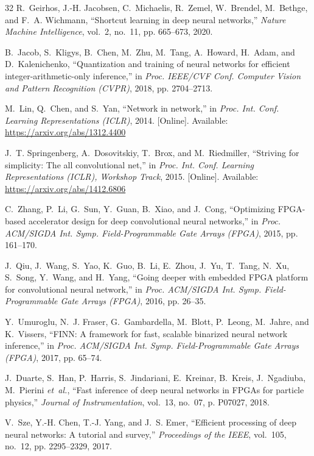 \documentclass[conference]{IEEEtran}
\begin{document}
\begin{thebibliography}{32}
R.~Geirhos, J.-H. Jacobsen, C.~Michaelis, R.~Zemel, W.~Brendel, M.~Bethge, and F.~A. Wichmann,
``Shortcut learning in deep neural networks,'' \emph{Nature Machine Intelligence}, vol.~2,
no.~11, pp. 665--673, 2020.

B.~Jacob, S.~Kligys, B.~Chen, M.~Zhu, M.~Tang, A.~Howard, H.~Adam, and D.~Kalenichenko,
``Quantization and training of neural networks for efficient integer-arithmetic-only
inference,'' in \emph{Proc. IEEE/CVF Conf. Computer Vision and Pattern Recognition (CVPR)},
2018, pp. 2704--2713.

M.~Lin, Q.~Chen, and S.~Yan, ``Network in network,'' in \emph{Proc. Int. Conf. Learning
Representations (ICLR)}, 2014. [Online]. Available: \url{https://arxiv.org/abs/1312.4400}

J.~T. Springenberg, A.~Dosovitskiy, T.~Brox, and M.~Riedmiller, ``Striving for simplicity: The
all convolutional net,'' in \emph{Proc. Int. Conf. Learning Representations (ICLR), Workshop
Track}, 2015. [Online]. Available: \url{https://arxiv.org/abs/1412.6806}

C.~Zhang, P.~Li, G.~Sun, Y.~Guan, B.~Xiao, and J.~Cong, ``Optimizing {FPGA}-based accelerator
design for deep convolutional neural networks,'' in \emph{Proc. ACM/SIGDA Int. Symp.
Field-Programmable Gate Arrays (FPGA)}, 2015, pp. 161--170.

J.~Qiu, J.~Wang, S.~Yao, K.~Guo, B.~Li, E.~Zhou, J.~Yu, T.~Tang, N.~Xu, S.~Song, Y.~Wang, and
H.~Yang, ``Going deeper with embedded {FPGA} platform for convolutional neural network,'' in
\emph{Proc. ACM/SIGDA Int. Symp. Field-Programmable Gate Arrays (FPGA)}, 2016, pp. 26--35.

Y.~Umuroglu, N.~J. Fraser, G.~Gambardella, M.~Blott, P.~Leong, M.~Jahre, and K.~Vissers,
``{FINN}: A framework for fast, scalable binarized neural network inference,'' in \emph{Proc.
ACM/SIGDA Int. Symp. Field-Programmable Gate Arrays (FPGA)}, 2017, pp. 65--74.

J.~Duarte, S.~Han, P.~Harris, S.~Jindariani, E.~Kreinar, B.~Kreis, J.~Ngadiuba, M.~Pierini
\emph{et~al.}, ``Fast inference of deep neural networks in {FPGAs} for particle physics,''
\emph{Journal of Instrumentation}, vol.~13, no.~07, p. P07027, 2018.

V.~Sze, Y.-H. Chen, T.-J. Yang, and J.~S. Emer, ``Efficient processing of deep neural networks:
A tutorial and survey,'' \emph{Proceedings of the IEEE}, vol.~105, no.~12, pp. 2295--2329, 2017.


\end{thebibliography}
\end{document}
